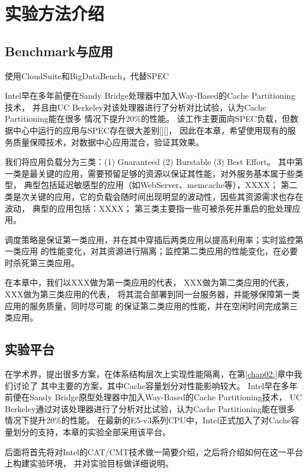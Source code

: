 \section{实验方法介绍}

\subsection{Benchmark与应用}

使用CloudSuite和BigDataBench，代替SPEC

Intel早在多年前便在Sandy Bridge处理器中加入Way-Based的Cache Partitioning技术，
并且由UC Berkeley对该处理器进行了分析对比试验，认为Cache Partitioning能在很多
情况下提升20\%的性能。
该工作主要面向SPEC负载，但数据中心中运行的应用与SPEC存在很大差别[][]，
因此在本章，希望使用现有的服务质量保障技术，对数据中心应用混合，验证其效果。

我们将应用负载分为三类：(1) Guaranteed (2) Burstable (3) Best Effort。
其中第一类是最关键的应用，需要预留足够的资源以保证其性能，对外服务基本属于些类型，
典型包括延迟敏感型的应用（如WebServer、memcache等），XXXX； %
第二类是次关键的应用，它的负载会随时间出现明显的波动性，因些其资源需求也存在波动，
典型的应用包括：XXXX； %
第三类主要指一些可被杀死并重启的批处理应用。 %

调度策略是保证第一类应用，并在其中穿插后两类应用以提高利用率；实时监控第一类应用
的性能变化，对其资源进行隔离；监控第二类应用的性能变化，在必要时杀死第三类应用。

在本章中，我们以XXX做为第一类应用的代表， %
XXX做为第二类应用的代表，			%
XXX做为第三类应用的代表，			%
将其混合部署到同一台服务器，并能够保障第一类应用的服务质量，同时尽可能
的保证第二类应用的性能，并在空闲时间完成第三类应用。

\subsection{实验平台}

在学术界，提出很多方案，在体系结构层次上实现性能隔离，在第\ref{chap02:}章中我们讨论了
其中主要的方案，其中Cache容量划分对性能影响较大。
Intel早在多年前便在Sandy Bridge原型处理器中加入Way-Based的Cache Partitioning技术，
UC Berkeley通过对该处理器进行了分析对比试验，认为Cache Partitioning能在很多
情况下提升20\%的性能。
在最新的E5-v3系列CPU中，Intel正式加入了对Cache容量划分的支持，本章的实验全部采用该平台。

后面将首先将对Intel的CAT/CMT技术做一简要介绍，之后将介绍如何在这一平台上构建实验环境，
并对实验目标做详细说明。



